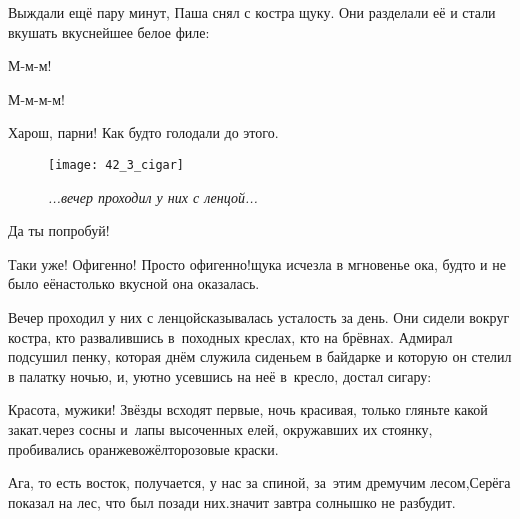 Выждали ещё пару минут, Паша снял с костра щуку. Они разделали её и стали вкушать вкуснейшее белое филе:

\diagdash М-м-м!

\diagdash М-м-м-м!

\diagdash Харош, парни! Как будто голодали до этого. %


\begin{figure}[h]
	\centering
	\texttt{[image: 42\_3\_cigar]}
	\caption{\small\textit{...вечер проходил у них с ленцой...}}
\end{figure}


\diagdash Да ты попробуй!

\diagdash Таки уже! Офигенно! Просто офигенно!\mdash щука исчезла в мгновенье ока, будто и не было её\mdash настолько вкусной она оказалась.


Вечер проходил у них с ленцой\mdash сказывалась усталость за день. Они сидели вокруг костра, кто развалившись в~походных креслах, кто на брёвнах. Адмирал подсушил пенку, которая днём служила сиденьем в байдарке и которую он стелил в палатку ночью, и, уютно усевшись на неё в~кресло, достал сигару:


\diagdash Красота, мужики! Звёзды всходят первые, ночь красивая, только гляньте какой закат.\mdash через сосны и~лапы высоченных елей, окружавших их стоянку, пробивались оранжево\sdash жёлто\sdash розовые краски.

\diagdash Ага, то есть восток, получается, у нас за спиной, за~этим дремучим лесом,\mdash Серёга показал на лес, что был позади них.\mdash значит завтра солнышко не разбудит. 

